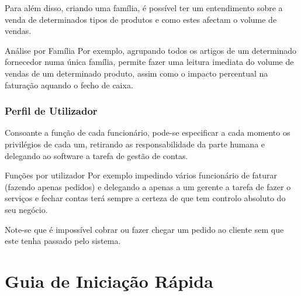 \documentclass[a4paper,11pt,openany]{memoir}
\begin{document}
Para além disso, criando uma família, é possível ter um entendimento sobre a venda de determinados tipos de produtos e como estes afectam o volume de vendas. 



\begin{bclogo}[couleur=blue!10,arrondi=0.1,logo=\bclampe,ombre=true]{Análise por Família}
Por exemplo, agrupando todos os artigos de um determinado fornecedor numa única família, 
permite fazer uma leitura imediata do volume de vendas de um determinado produto, 
assim como o impacto percentual na faturação aquando o fecho de caixa.
\end{bclogo}


\subsection{Perfil de Utilizador}

Consoante a função de cada funcionário, pode-se especificar a cada momento os privilégios de cada um,
retirando as responsabilidade da parte humana e delegando ao software a tarefa de gestão de contas.

\begin{bclogo}[couleur=blue!10,arrondi=0.1,logo=\bccrayon,ombre=true]{Funções por utilizador}
Por exemplo impedindo vários funcionário de faturar (fazendo apenas pedidos) e 
delegando a apenas a um gerente a tarefa de fazer o serviços e fechar contas terá
sempre a certeza de que tem controlo absoluto do seu negócio.

Note-se que é impossível cobrar ou fazer chegar um pedido ao cliente sem que este tenha passado pelo sistema.
\end{bclogo}









\chapter{Guia de Iniciação Rápida}  %
\end{document}
